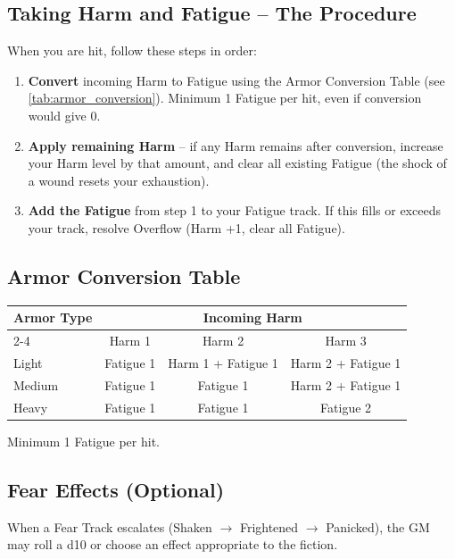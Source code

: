 \subsection{Taking Harm and Fatigue -- The Procedure}
When you are hit, follow these steps in order:

\begin{enumerate}
    \item \textbf{Convert} incoming Harm to Fatigue using the Armor Conversion
        Table (see \autoref{tab:armor_conversion}). Minimum 1 Fatigue per hit,
        even if conversion would give 0.
    \item \textbf{Apply remaining Harm} -- if any Harm remains after conversion,
        increase your Harm level by that amount, and clear all existing Fatigue
        (the shock of a wound resets your exhaustion).
    \item \textbf{Add the Fatigue} from step 1 to your Fatigue track. If this
        fills or exceeds your track, resolve Overflow (Harm +1, clear all Fatigue).
\end{enumerate}

\subsection{Armor Conversion Table}\label{tab:armor_conversion}
\begin{center}
\begin{tabular}{lccc}
\toprule
\textbf{Armor Type} & \multicolumn{3}{c}{\textbf{Incoming Harm}} \\
\cmidrule(lr){2-4}
                   & Harm 1 & Harm 2 & Harm 3 \\
\midrule
Light  & Fatigue 1 & Harm 1 + Fatigue 1 & Harm 2 + Fatigue 1 \\
Medium & Fatigue 1 & Fatigue 1           & Harm 2 + Fatigue 1 \\
Heavy  & Fatigue 1 & Fatigue 1           & Fatigue 2 \\
\bottomrule
\end{tabular}
\end{center}
Minimum 1 Fatigue per hit.

\subsection{Fear Effects (Optional)}\label{subsec:fear_effects}

When a Fear Track escalates (Shaken $\rightarrow$ Frightened $\rightarrow$ Panicked),
the GM may roll a d10 or choose an effect appropriate to the fiction.

